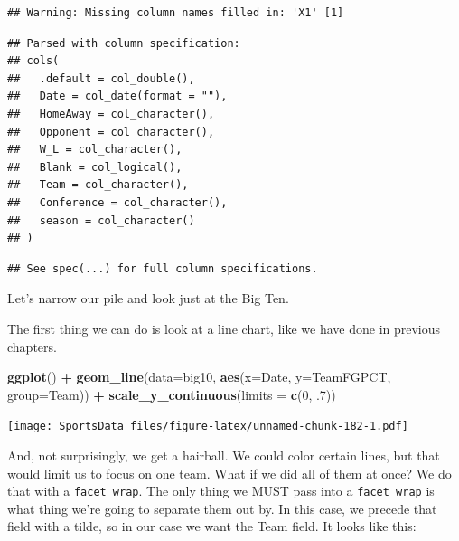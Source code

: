 \documentclass[]{book}
\newenvironment{Shaded}{\begin{snugshade}}{\end{snugshade}}
\newcommand{\DataTypeTok}[1]{\textcolor[rgb]{0.13,0.29,0.53}{#1}}
\newcommand{\DecValTok}[1]{\textcolor[rgb]{0.00,0.00,0.81}{#1}}
\newcommand{\FloatTok}[1]{\textcolor[rgb]{0.00,0.00,0.81}{#1}}
\newcommand{\KeywordTok}[1]{\textcolor[rgb]{0.13,0.29,0.53}{\textbf{#1}}}
\newcommand{\NormalTok}[1]{#1}
\newcommand{\OperatorTok}[1]{\textcolor[rgb]{0.81,0.36,0.00}{\textbf{#1}}}
\newcommand{\StringTok}[1]{\textcolor[rgb]{0.31,0.60,0.02}{#1}}
\begin{document}
\begin{verbatim}
## Warning: Missing column names filled in: 'X1' [1]
\end{verbatim}

\begin{verbatim}
## Parsed with column specification:
## cols(
##   .default = col_double(),
##   Date = col_date(format = ""),
##   HomeAway = col_character(),
##   Opponent = col_character(),
##   W_L = col_character(),
##   Blank = col_logical(),
##   Team = col_character(),
##   Conference = col_character(),
##   season = col_character()
## )
\end{verbatim}

\begin{verbatim}
## See spec(...) for full column specifications.
\end{verbatim}

Let's narrow our pile and look just at the Big Ten.

\begin{Shaded}
\end{Shaded}

The first thing we can do is look at a line chart, like we have done in previous chapters.

\begin{Shaded}
\begin{Highlighting}[]
\KeywordTok{ggplot}\NormalTok{() }\OperatorTok{+}\StringTok{ }\KeywordTok{geom_line}\NormalTok{(}\DataTypeTok{data=}\NormalTok{big10, }\KeywordTok{aes}\NormalTok{(}\DataTypeTok{x=}\NormalTok{Date, }\DataTypeTok{y=}\NormalTok{TeamFGPCT, }\DataTypeTok{group=}\NormalTok{Team)) }\OperatorTok{+}\StringTok{ }\KeywordTok{scale_y_continuous}\NormalTok{(}\DataTypeTok{limits =} \KeywordTok{c}\NormalTok{(}\DecValTok{0}\NormalTok{, }\FloatTok{.7}\NormalTok{))}
\end{Highlighting}
\end{Shaded}

\texttt{[image: SportsData\_files/figure-latex/unnamed-chunk-182-1.pdf]}

And, not surprisingly, we get a hairball. We could color certain lines, but that would limit us to focus on one team. What if we did all of them at once? We do that with a \texttt{facet\_wrap}. The only thing we MUST pass into a \texttt{facet\_wrap} is what thing we're going to separate them out by. In this case, we precede that field with a tilde, so in our case we want the Team field. It looks like this:
\end{document}
